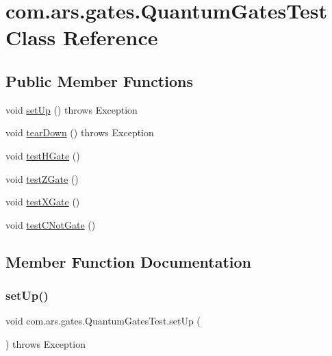 \hypertarget{classcom_1_1ars_1_1gates_1_1_quantum_gates_test}{}\section{com.\+ars.\+gates.\+Quantum\+Gates\+Test Class Reference}
\label{classcom_1_1ars_1_1gates_1_1_quantum_gates_test}
\subsection*{Public Member Functions}
\begin{DoxyCompactItemize}
\item 
void \hyperlink{classcom_1_1ars_1_1gates_1_1_quantum_gates_test_ac6bd719c947a40468a9f5fc8e7861739}{set\+Up} ()  throws Exception 
\item 
void \hyperlink{classcom_1_1ars_1_1gates_1_1_quantum_gates_test_a9709dfe4377b2459777e814a52d8a591}{tear\+Down} ()  throws Exception 
\item 
void \hyperlink{classcom_1_1ars_1_1gates_1_1_quantum_gates_test_a92187d5f38a054492896c3fe55ca6de3}{test\+H\+Gate} ()
\item 
void \hyperlink{classcom_1_1ars_1_1gates_1_1_quantum_gates_test_a3149a4e2edd55f7e92974d014ec94484}{test\+Z\+Gate} ()
\item 
void \hyperlink{classcom_1_1ars_1_1gates_1_1_quantum_gates_test_a38b64a39ed314a921858b2b11bfd9b6f}{test\+X\+Gate} ()
\item 
void \hyperlink{classcom_1_1ars_1_1gates_1_1_quantum_gates_test_a9b3279f116ab4884f992562072132783}{test\+C\+Not\+Gate} ()
\end{DoxyCompactItemize}


\subsection{Member Function Documentation}
\hypertarget{classcom_1_1ars_1_1gates_1_1_quantum_gates_test_ac6bd719c947a40468a9f5fc8e7861739}{}\label{classcom_1_1ars_1_1gates_1_1_quantum_gates_test_ac6bd719c947a40468a9f5fc8e7861739} 
\subsubsection{\texorpdfstring{set\+Up()}{setUp()}}
{\footnotesize\ttfamily void com.\+ars.\+gates.\+Quantum\+Gates\+Test.\+set\+Up (\begin{DoxyParamCaption}{ }\end{DoxyParamCaption}) throws Exception}

